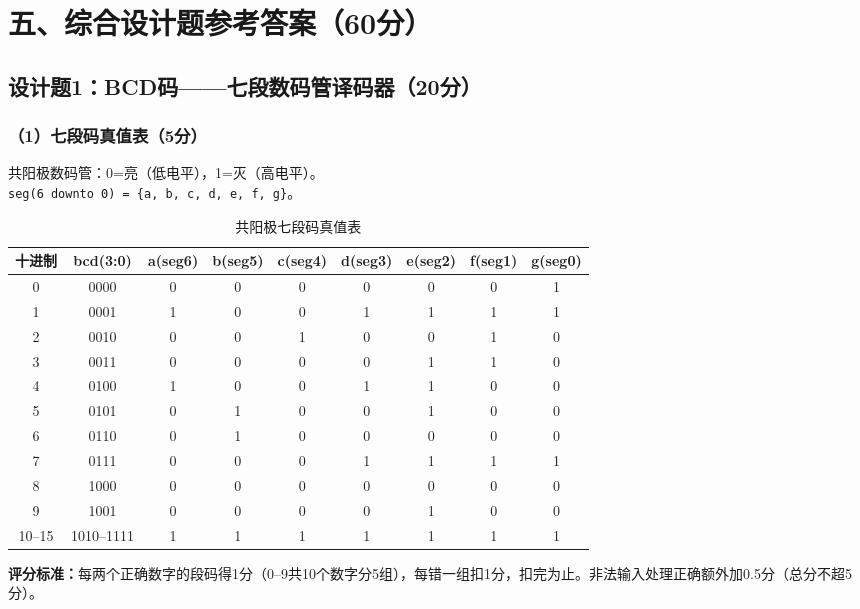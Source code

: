 \section{五、综合设计题参考答案（60分）}

\subsection*{设计题1：BCD码——七段数码管译码器（20分）}

\subsubsection*{（1）七段码真值表（5分）}

共阳极数码管：0=亮（低电平），1=灭（高电平）。\\
\texttt{seg(6 downto 0) = \{a, b, c, d, e, f, g\}}。

\begin{table}[h]
\centering
\caption{共阳极七段码真值表}
\begin{tabular}{|c|c|c|c|c|c|c|c|c|}
\hline
\textbf{十进制} & \textbf{bcd(3:0)} & \textbf{a(seg6)} & \textbf{b(seg5)} & \textbf{c(seg4)} & \textbf{d(seg3)} & \textbf{e(seg2)} & \textbf{f(seg1)} & \textbf{g(seg0)} \\
\hline
0 & 0000 & 0 & 0 & 0 & 0 & 0 & 0 & 1 \\
1 & 0001 & 1 & 0 & 0 & 1 & 1 & 1 & 1 \\
2 & 0010 & 0 & 0 & 1 & 0 & 0 & 1 & 0 \\
3 & 0011 & 0 & 0 & 0 & 0 & 1 & 1 & 0 \\
4 & 0100 & 1 & 0 & 0 & 1 & 1 & 0 & 0 \\
5 & 0101 & 0 & 1 & 0 & 0 & 1 & 0 & 0 \\
6 & 0110 & 0 & 1 & 0 & 0 & 0 & 0 & 0 \\
7 & 0111 & 0 & 0 & 0 & 1 & 1 & 1 & 1 \\
8 & 1000 & 0 & 0 & 0 & 0 & 0 & 0 & 0 \\
9 & 1001 & 0 & 0 & 0 & 0 & 1 & 0 & 0 \\
10--15 & 1010--1111 & 1 & 1 & 1 & 1 & 1 & 1 & 1 \\
\hline
\end{tabular}
\end{table}

\textbf{评分标准：}每两个正确数字的段码得1分（0--9共10个数字分5组），每错一组扣1分，扣完为止。非法输入处理正确额外加0.5分（总分不超5分）。

